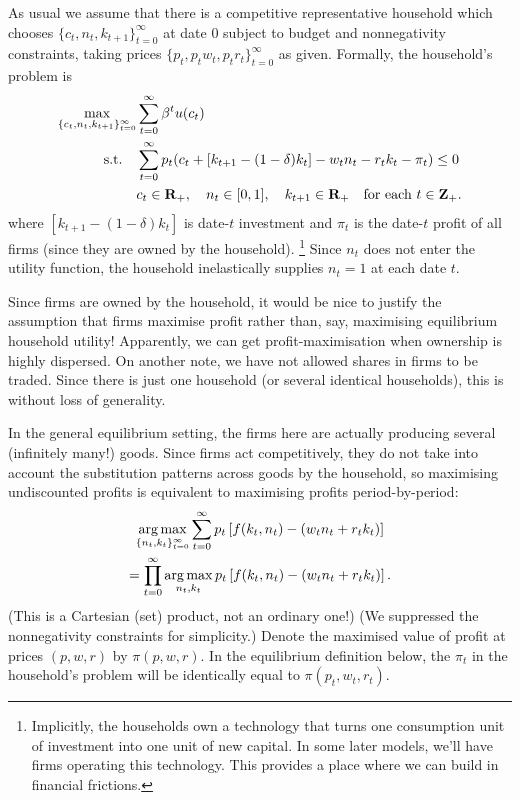\documentclass[11pt,letterpaper,reqno,oneside]{article}
\begin{document}
As usual we assume that there is a competitive representative household which chooses $\{ c_t, n_t, k_{t+1} \}_{t=0}^\infty$ at date $0$ subject to budget and nonnegativity constraints, taking prices $\{ p_t, p_t w_t, p_t r_t \}_{t=0}^\infty$ as given. Formally, the household's problem is
%
\begin{align*}
	\max_{ \{c_t,n_t,k_{t+1}\}_{t=0}^\infty } 
	&\sum_{t=0}^\infty \beta^t u(c_t)
	\\
	\text{s.t.}\quad
	&\sum_{t=0}^\infty p_t( c_t + [k_{t+1} - (1-\delta)k_t] - w_t n_t - r_t k_t - \pi_t ) \leq 0 
	\\
	&c_t \in \mathbf{R}_+, \quad n_t \in [0,1], \quad k_{t+1} \in \mathbf{R}_+
	\quad\text{for each $t \in \mathbf{Z}_+$} .
\end{align*}
%
where $[k_{t+1} - (1-\delta)k_t]$ is date-$t$ investment and $\pi_t$ is the date-$t$ profit of all firms (since they are owned by the household).%
	\footnote{Implicitly, the households own a technology that turns one consumption unit of investment into one unit of new capital. In some later models, we'll have firms operating this technology. This provides a place where we can build in financial frictions.}
Since $n_t$ does not enter the utility function, the household inelastically supplies $n_t=1$ at each date $t$.

Since firms are owned by the household, it would be nice to justify the assumption that firms maximise profit rather than, say, maximising equilibrium household utility! Apparently, we can get profit-maximisation when ownership is highly dispersed. On another note, we have not allowed shares in firms to be traded. Since there is just one household (or several identical households), this is without loss of generality.

In the general equilibrium setting, the firms here are actually producing several (infinitely many!) goods. Since firms act competitively, they do not take into account the substitution patterns across goods by the household, so maximising undiscounted profits is equivalent to maximising profits period-by-period:
%
\begin{multline*}
	\operatorname*{arg\,max}_{ \{n_t,k_t\}_{t=0}^\infty } 
	\sum_{t=0}^\infty p_t \left[ 
	f(k_t,n_t) 
	- ( w_t n_t + r_t k_t )
	\right]
	\\
	=
	\prod_{t=0}^\infty \operatorname*{arg\,max}_{n_t,k_t} p_t \left[ 
	f(k_t,n_t) 
	- ( w_t n_t + r_t k_t )
	\right] .
\end{multline*}
%
(This is a Cartesian (set) product, not an ordinary one!) (We suppressed the nonnegativity constraints for simplicity.) Denote the maximised value of profit at prices $(p,w,r)$ by $\pi(p,w,r)$. In the equilibrium definition below, the $\pi_t$ in the household's problem will be identically equal to $\pi(p_t,w_t,r_t)$.
\end{document}
